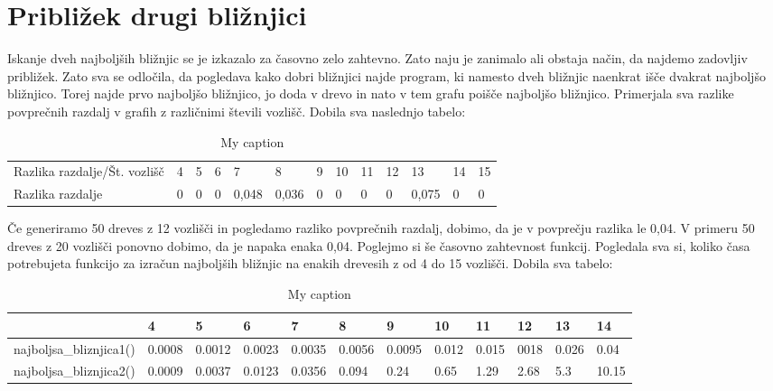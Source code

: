 \documentclass[a4paper,10pt]{article}
\begin{document}
{\section{Približek drugi bližnjici}
Iskanje dveh najboljših bližnjic se je izkazalo za časovno zelo zahtevno. Zato naju je zanimalo ali obstaja način, da najdemo zadovljiv približek. Zato sva se odločila, da pogledava kako dobri bližnjici najde program, ki namesto dveh bližnjic naenkrat išče dvakrat najboljšo bližnjico. Torej najde prvo najboljšo bližnjico, jo doda v drevo in nato v tem grafu poišče najboljšo bližnjico. Primerjala sva razlike povprečnih razdalj v grafih z različnimi števili vozlišč. Dobila sva naslednjo tabelo: \newline
\begin{table}[]
\centering
\caption{My caption}
\label{my-label}
\begin{tabular}{lllllllllllll}
Razlika razdalje/Št. vozlišč & 4 & 5 & 6 & 7     & 8     & 9 & 10 & 11 & 12 & 13    & 14 & 15 \\
Razlika razdalje             & 0 & 0 & 0 & 0,048 & 0,036 & 0 & 0  & 0  & 0  & 0,075 & 0  & 0 
\end{tabular}
\end{table}
\newline
Če generiramo 50 dreves z 12 vozlišči in pogledamo razliko povprečnih razdalj, dobimo, da je v povprečju razlika le 0,04. V primeru 50 dreves z 20 vozlišči ponovno dobimo, da je napaka enaka 0,04. \newline
Poglejmo si še časovno zahtevnost funkcij. Pogledala sva si, koliko časa potrebujeta funkcijo za izračun najboljših bližnjic na enakih drevesih z od 4 do 15 vozlišči. Dobila sva tabelo: \newline
\begin{table}[]
\centering
\caption{My caption}
\label{my-label}
\begin{tabular}{|l|l|l|l|l|l|l|l|l|l|l|l|}
\hline
                        & 4      & 5      & 6      & 7      & 8      & 9      & 10    & 11    & 12   & 13    & 14    \\ \hline
najboljsa\_bliznjica1() & 0.0008 & 0.0012 & 0.0023 & 0.0035 & 0.0056 & 0.0095 & 0.012 & 0.015 & 0018 & 0.026 & 0.04  \\ \hline
najboljsa\_bliznjica2() & 0.0009 & 0.0037 & 0.0123 & 0.0356 & 0.094  & 0.24   & 0.65  & 1.29  & 2.68 & 5.3   & 10.15 \\ \hline
\end{tabular}
\end{table}
\newline

}
\end{document}
